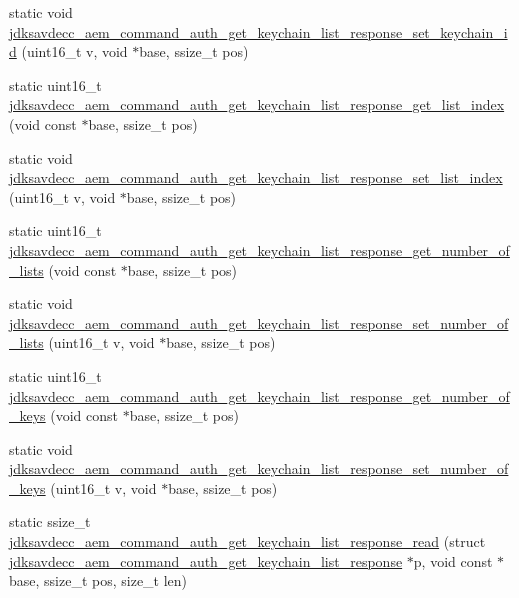 \begin{DoxyCompactItemize}
\item 
static void \hyperlink{group__command__auth__get__keychain__list__response_gaefdd01beb92cac17455af0ad0efd40eb}{jdksavdecc\+\_\+aem\+\_\+command\+\_\+auth\+\_\+get\+\_\+keychain\+\_\+list\+\_\+response\+\_\+set\+\_\+keychain\+\_\+id} (uint16\+\_\+t v, void $\ast$base, ssize\+\_\+t pos)
\item 
static uint16\+\_\+t \hyperlink{group__command__auth__get__keychain__list__response_ga2a77f4181b7f59ee692a3c64f0d5396b}{jdksavdecc\+\_\+aem\+\_\+command\+\_\+auth\+\_\+get\+\_\+keychain\+\_\+list\+\_\+response\+\_\+get\+\_\+list\+\_\+index} (void const $\ast$base, ssize\+\_\+t pos)
\item 
static void \hyperlink{group__command__auth__get__keychain__list__response_ga9567a961bc439fd27ff40c498161f80b}{jdksavdecc\+\_\+aem\+\_\+command\+\_\+auth\+\_\+get\+\_\+keychain\+\_\+list\+\_\+response\+\_\+set\+\_\+list\+\_\+index} (uint16\+\_\+t v, void $\ast$base, ssize\+\_\+t pos)
\item 
static uint16\+\_\+t \hyperlink{group__command__auth__get__keychain__list__response_gaa937bedc129318715327f79c0f53971f}{jdksavdecc\+\_\+aem\+\_\+command\+\_\+auth\+\_\+get\+\_\+keychain\+\_\+list\+\_\+response\+\_\+get\+\_\+number\+\_\+of\+\_\+lists} (void const $\ast$base, ssize\+\_\+t pos)
\item 
static void \hyperlink{group__command__auth__get__keychain__list__response_ga1f22774fd28056c38a2ad443b9f52cd8}{jdksavdecc\+\_\+aem\+\_\+command\+\_\+auth\+\_\+get\+\_\+keychain\+\_\+list\+\_\+response\+\_\+set\+\_\+number\+\_\+of\+\_\+lists} (uint16\+\_\+t v, void $\ast$base, ssize\+\_\+t pos)
\item 
static uint16\+\_\+t \hyperlink{group__command__auth__get__keychain__list__response_ga8ad0899731126810ac06863ab664020e}{jdksavdecc\+\_\+aem\+\_\+command\+\_\+auth\+\_\+get\+\_\+keychain\+\_\+list\+\_\+response\+\_\+get\+\_\+number\+\_\+of\+\_\+keys} (void const $\ast$base, ssize\+\_\+t pos)
\item 
static void \hyperlink{group__command__auth__get__keychain__list__response_ga3c3b66616f9affa6b50e9aad20b1ed24}{jdksavdecc\+\_\+aem\+\_\+command\+\_\+auth\+\_\+get\+\_\+keychain\+\_\+list\+\_\+response\+\_\+set\+\_\+number\+\_\+of\+\_\+keys} (uint16\+\_\+t v, void $\ast$base, ssize\+\_\+t pos)
\item 
static ssize\+\_\+t \hyperlink{group__command__auth__get__keychain__list__response_ga8c3a97e427e166b0ae38dfffa63d98b5}{jdksavdecc\+\_\+aem\+\_\+command\+\_\+auth\+\_\+get\+\_\+keychain\+\_\+list\+\_\+response\+\_\+read} (struct \hyperlink{structjdksavdecc__aem__command__auth__get__keychain__list__response}{jdksavdecc\+\_\+aem\+\_\+command\+\_\+auth\+\_\+get\+\_\+keychain\+\_\+list\+\_\+response} $\ast$p, void const $\ast$base, ssize\+\_\+t pos, size\+\_\+t len)

\end{DoxyCompactItemize}

